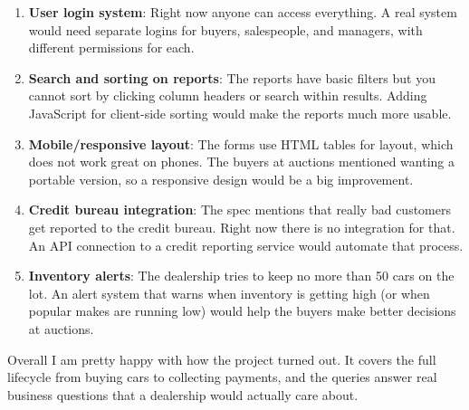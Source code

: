 \documentclass[12pt]{article}
\begin{document}
\begin{enumerate}
  \item \textbf{User login system}: Right now anyone can access everything. A real system would need separate logins for buyers, salespeople, and managers, with different permissions for each. 

  \item \textbf{Search and sorting on reports}: The reports have basic filters but you cannot sort by clicking column headers or search within results. Adding JavaScript for client-side sorting would make the reports much more usable.

  \item \textbf{Mobile/responsive layout}: The forms use HTML tables for layout, which does not work great on phones. The buyers at auctions mentioned wanting a portable version, so a responsive design would be a big improvement.

  \item \textbf{Credit bureau integration}: The spec mentions that really bad customers get reported to the credit bureau. Right now there is no integration for that. An API connection to a credit reporting service would automate that process.

  \item \textbf{Inventory alerts}: The dealership tries to keep no more than 50 cars on the lot. An alert system that warns when inventory is getting high (or when popular makes are running low) would help the buyers make better decisions at auctions.
\end{enumerate}

Overall I am pretty happy with how the project turned out. It covers the full lifecycle from buying cars to collecting payments, and the queries answer real business questions that a dealership would actually care about.
\end{document}
